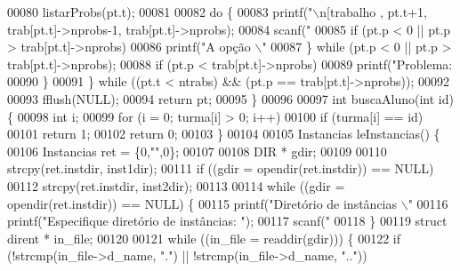 \begin{DoxyCode}
{{{{{{{00080                         listarProbs(pt.t);
00081 
00082                         \textcolor{keywordflow}{do} \{
00083                                 printf(\textcolor{stringliteral}{"\(\backslash\)n[trabalho %
      , pt.t+1, trab[pt.t]->nprobs-1, trab[pt.t]->nprobs);
00084                                 scanf(\textcolor{stringliteral}{"%
00085                                 \textcolor{keywordflow}{if} (pt.p < 0 || pt.p > trab[pt.t]->nprobs)
00086                                         printf(\textcolor{stringliteral}{"A opção \(\backslash\)"%
00087                         \} \textcolor{keywordflow}{while} (pt.p < 0 || pt.p > trab[pt.t]->nprobs);
00088                         \textcolor{keywordflow}{if} (pt.p < trab[pt.t]->nprobs)
00089                                 printf(\textcolor{stringliteral}{"Problema: %
00090                 \}
00091         \} \textcolor{keywordflow}{while} ((pt.t < ntrabs) && (pt.p == trab[pt.t]->nprobs));
00092 
00093         fflush(NULL);
00094         \textcolor{keywordflow}{return} pt;
00095 \}
00096 
00097 \textcolor{keywordtype}{int} buscaAluno(\textcolor{keywordtype}{int} \textcolor{keywordtype}{id}) \{
00098         \textcolor{keywordtype}{int} i;
00099         \textcolor{keywordflow}{for} (i = 0; turma[i] > 0; i++)
00100                 \textcolor{keywordflow}{if} (turma[i] == \textcolor{keywordtype}{id})
00101                         \textcolor{keywordflow}{return} 1;
00102         \textcolor{keywordflow}{return} 0;
00103 \}
00104 
00105 Instancias leInstancias() \{
00106         Instancias ret = \{0,\textcolor{stringliteral}{""},0\};
00107 
00108         DIR * gdir;
00109 
00110         strcpy(ret.instdir, inst1dir);
00111         \textcolor{keywordflow}{if} ((gdir = opendir(ret.instdir)) == NULL)
00112                 strcpy(ret.instdir, inst2dir);
00113 
00114         \textcolor{keywordflow}{while} ((gdir = opendir(ret.instdir)) == NULL) \{
00115                 printf(\textcolor{stringliteral}{"Diretório de instâncias \(\backslash\)"%
00116                 printf(\textcolor{stringliteral}{"Especifique diretório de instâncias: "});
00117                 scanf(\textcolor{stringliteral}{"%
00118         \}
00119         \textcolor{keyword}{struct }dirent * in\_file;
00120 
00121         \textcolor{keywordflow}{while} ((in\_file = readdir(gdir))) \{
00122                 \textcolor{keywordflow}{if} (!strcmp(in\_file->d\_name, \textcolor{stringliteral}{"."}) || !strcmp(in\_file->d\_name, \textcolor{stringliteral}{".."}))
}}}}}}}}}}}}}
\end{DoxyCode}
